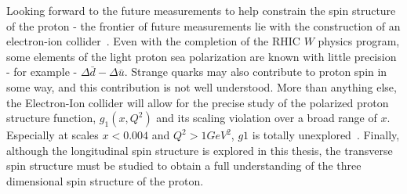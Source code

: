 Looking forward to the future measurements to help constrain the spin structure
of the proton - the frontier of future measurements lie with the construction of
an electron-ion collider~\cite{Aschenauer2016}. Even with the completion of the
RHIC $W$ physics program, some elements of the light proton sea polarization are
known with little precision - for example - $\Delta\bar{d}-\Delta\bar{u}$.
Strange quarks may also contribute to proton spin in some way, and this
contribution is not well understood. More than anything else, the Electron-Ion
collider will allow for the precise study of the polarized proton structure
function, $g_1(x,Q^2)$ and its scaling violation over a broad range of $x$.
Especially at scales $x < 0.004$ and $Q^2 > 1 GeV^2$, $g1$ is totally
unexplored~\cite{Accardi2012}. Finally, although the longitudinal spin structure
is explored in this thesis, the transverse spin structure must be studied to
obtain a full understanding of the three dimensional spin structure of the
proton.
